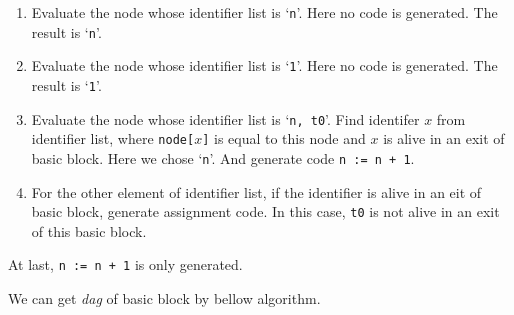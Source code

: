 \begin{Example}
\begin{enumerate}
\item Evaluate the node whose identifier list is `{\tt{n}}'.
      Here no code is generated. The result is `{\tt{n}}'.

\item Evaluate the node whose identifier list is `{\tt{1}}'.
      Here no code is generated. The result is `{\tt{1}}'.

\item Evaluate the node whose identifier list is `{\tt{n, t0}}'.
      Find identifer $x$ from identifier list, where {\tt{node[$x$]}} is equal
      to this node and $x$ is alive in an exit of basic block.
      Here we chose `{\tt{n}}'.
      And generate code {\tt{n := n + 1}}.
 
\item For the other element of identifier list, if the identifier
      is alive in an eit of basic block, generate assignment code.
      In this case, {\tt{t0}} is not alive in an exit of this
      basic block.

\end{enumerate}
At last, {\tt{n := n + 1}} is only generated.
\end{Example}

We can get {\em dag} of basic block by bellow algorithm.

